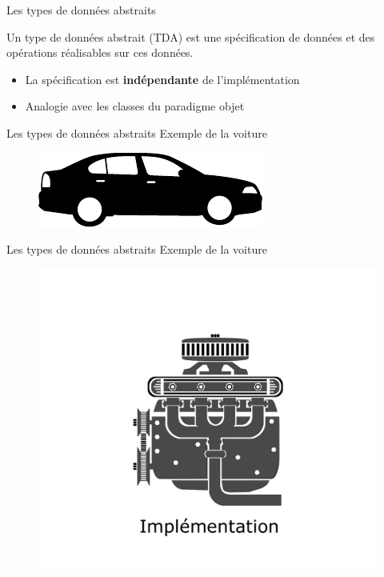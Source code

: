 \documentclass[12pt,a4paper,handout]{beamer}
\begin{document}
\begin{frame}{Les types de données abstraits}

\begin{definition}
Un type de données abstrait (TDA) est une spécification de données et des opérations réalisables sur ces données.
\end{definition}

\begin{itemize} 
\item La spécification est \textbf{indépendante} de l'implémentation
\item Analogie avec les classes du paradigme objet
\end{itemize}

\end{frame}

\begin{frame}{Les types de données abstraits}
{Exemple de la voiture}

\begin{figure}
\includegraphics[scale=2]{figs/car} 
\end{figure}
\end{frame}

\begin{frame}{Les types de données abstraits}
{Exemple de la voiture}

\begin{figure}
\includegraphics[scale=0.4]{figs/car1} 
\end{figure}


\end{frame}
\end{document}
